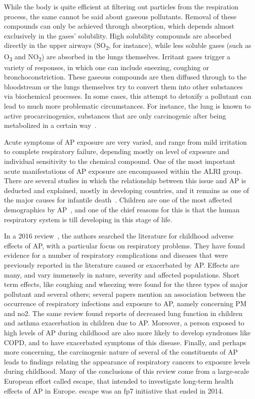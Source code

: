 While the body is quite efficient at filtering out particles from the
respiration process, the same cannot be said about gaseous pollutants.
Removal of these compounds can only be achieved through absorption,
which depends almost exclusively in the gases' solubility. High
solubility compounds are absorbed directly in the upper airways
(SO\textsubscript{2}, for instance), while less soluble gases (such as
O\textsubscript{3} and NO\textsubscript{2}) are absorbed in the lungs
themselves. Irritant gases trigger a variety of responses, in which one
can include sneezing, coughing or bronchoconstriction. These gaseous
compounds are then diffused through to the bloodstream or the lungs
themselves try to convert them into other substances via biochemical
processes. In some cases, this attempt to detoxify a pollutant can lead
to much more problematic circumstances. For instance, the lung is known
to active procarcinogenics, substances that are only carcinogenic after
being metabolized in a certain way~\cite{Vallero2014}.

Acute symptoms of \gls{AP} exposure are very varied, and range from mild
irritation to complete respiratory failure, depending mostly on level of
exposure and individual sensitivity to the chemical compound. One of the
most important acute manifestations of \gls{AP} exposure are encompassed
within the \gls{ALRI} group. There are several studies in which the
relationship between this issue and \gls{AP} is deducted and explained,
mostly in developing countries, and it remains as one of the major
causes for infantile death~\cite{CABI2019, UNICEF2013}. Children are one
of the most affected demographics by \gls{AP}~\cite{EEA2016}, and one of
the chief reasons for this is that the human respiratory system is till
developing in this stage of life.

In a 2016 review~\cite{Goldizen2016}, the authors searched the
literature for childhood adverse effects of \gls{AP}, with a particular
focus on respiratory problems. They have found evidence for a number of
respiratory complications and diseases that were previously reported in
the literature caused or exacerbated by \gls{AP}. Effects are many, and
vary immensely in nature, severity and affected populations. Short term
effects, like coughing and wheezing were found for the three types of
major pollutant and several others; several papers mention an
association between the occurrence of respiratory infections and
exposure to \gls{AP}, namely concerning \gls{PM} and \gls{no2}.  The
same review found reports of decreased lung function in children and
asthma exacerbation in children due to \acrlong{AP}. Moreover, a person
exposed to high levels of \gls{AP} during childhood are also more likely
to develop syndromes like \gls{COPD}, and to have exacerbated symptoms
of this disease. Finally, and perhaps more concerning, the carcinogenic
nature of several of the constituents of \gls{AP} leads to findings
relating the appearance of respiratory cancers to exposure levels during
childhood. Many of the conclusions of this review come from a
large-scale European effort called \gls{escape}, that intended to
investigate long-term health effects of \gls{AP} in Europe. \gls{escape}
was an \gls{fp7} initiative that ended in 2014.

